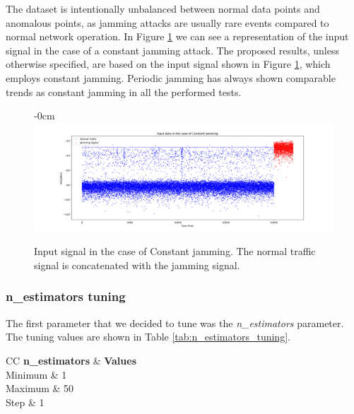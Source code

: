 \documentclass[futureinternet,article,submit,pdftex,moreauthors]{Definitions/mdpi}
\begin{document}
The dataset is intentionally unbalanced between normal data points and anomalous points, as jamming attacks are usually rare events compared to normal network operation. 
In Figure \ref{fig:InputSignal} we can see a representation of the input signal in the case of a constant jamming attack. The proposed results, unless otherwise specified, are based on the input signal shown in Figure \ref{fig:InputSignal}, which employs constant jamming. Periodic jamming has always shown comparable trends as constant jamming in all the performed tests.


\begin{figure}[H]
    \begin{adjustwidth}{-\extralength}{0cm}
        \centering
        \includegraphics[width=21cm]{img/InputSignal.png}
    \end{adjustwidth}
    \caption{Input signal in the case of Constant jamming. The normal traffic signal is concatenated with the jamming signal.}
    \label{fig:InputSignal}
\end{figure}


\subsubsection{n\_estimators tuning}

The first parameter that we decided to tune was the \textit{n\_estimators} parameter. The tuning values are shown in Table \ref{tab:n_estimators_tuning}.

\begin{table}[H]
	\caption{n\_estimators tuning values.}\label{tab:n_estimators_tuning}
	\begin{tabularx}{\textwidth}{CC}
	\toprule
	\textbf{n\_estimators} & \textbf{Values} \\
	\midrule
	Minimum & 1 \\
	Maximum & 50 \\
	Step & 1 \\
	\bottomrule
\end{tabularx}
\end{table}
\end{document}
